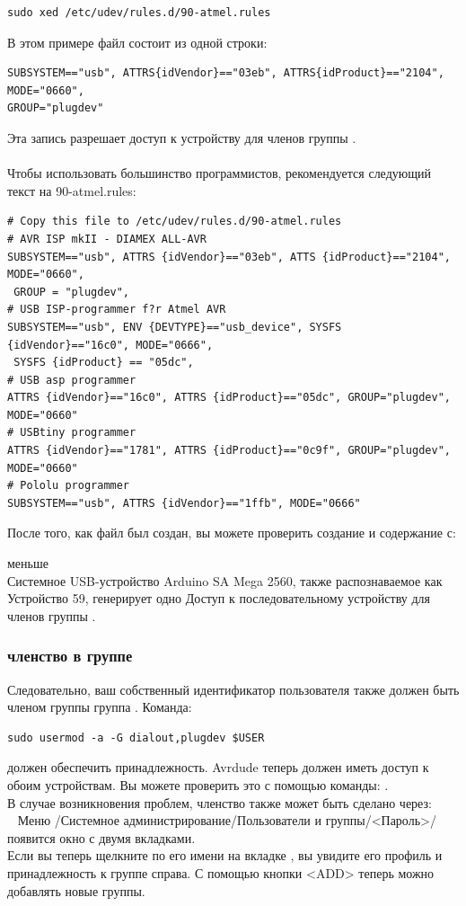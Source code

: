 \begin{large} \vspace{-0.4em} \begin{verbatim}
sudo xed /etc/udev/rules.d/90-atmel.rules
\end{verbatim} \end{large}
В этом примере файл  состоит из одной строки:
\begin{verbatim}
SUBSYSTEM=="usb", ATTRS{idVendor}=="03eb", ATTRS{idProduct}=="2104", MODE="0660",
GROUP="plugdev"
\end{verbatim}
Эта запись разрешает доступ к устройству для членов группы . \\
~ \\
Чтобы использовать большинство программистов, рекомендуется следующий текст на 90-atmel.rules:
\begin{verbatim}
# Copy this file to /etc/udev/rules.d/90-atmel.rules
# AVR ISP mkII - DIAMEX ALL-AVR
SUBSYSTEM=="usb", ATTRS {idVendor}=="03eb", ATTS {idProduct}=="2104", MODE="0660", 
 GROUP = "plugdev",
# USB ISP-programmer f?r Atmel AVR
SUBSYSTEM=="usb", ENV {DEVTYPE}=="usb_device", SYSFS {idVendor}=="16c0", MODE="0666",
 SYSFS {idProduct} == "05dc",
# USB asp programmer
ATTRS {idVendor}=="16c0", ATTRS {idProduct}=="05dc", GROUP="plugdev", MODE="0660"
# USBtiny programmer
ATTRS {idVendor}=="1781", ATTRS {idProduct}=="0c9f", GROUP="plugdev", MODE="0660"
# Pololu programmer
SUBSYSTEM=="usb", ATTRS {idVendor}=="1ffb", MODE="0666"
\end{verbatim}
После того, как файл был создан, вы можете проверить создание и содержание с:

меньше  \\
Системное USB-устройство Arduino SA Mega 2560, также распознаваемое как Устройство 59, генерирует одно
Доступ к последовательному устройству  для членов группы .
\subsubsection{членство в группе}
Следовательно, ваш собственный идентификатор пользователя также должен быть членом группы 
группа . Команда:

\begin{large} \vspace{-0.4em} \begin{verbatim}
sudo usermod -a -G dialout,plugdev $USER
\end{verbatim} \end{large}
должен обеспечить принадлежность.
Avrdude теперь должен иметь доступ к обоим устройствам.
Вы можете проверить это с помощью команды: . \\
В случае возникновения проблем, членство также может быть сделано через: \\
~ Меню /Системное администрирование/Пользователи и группы/<Пароль>/появится окно с двумя вкладками. \\
Если вы теперь щелкните по его имени на вкладке , вы увидите его профиль и принадлежность к группе справа.
С помощью кнопки <ADD> теперь можно добавлять новые группы.

